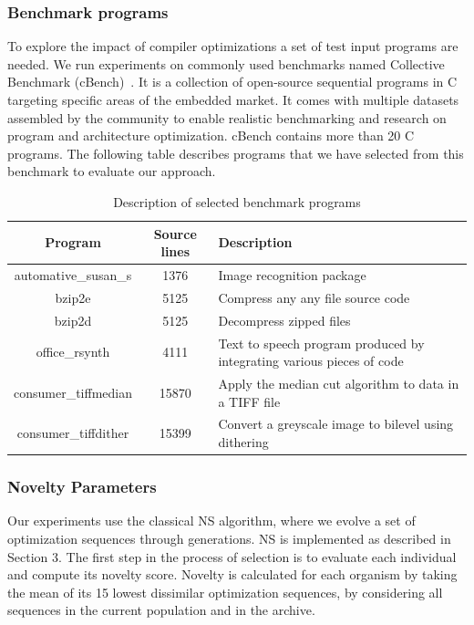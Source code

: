 \subsubsection{Benchmark programs}
To explore the impact of compiler optimizations a set of test input programs are needed. We run experiments on commonly used benchmarks named Collective Benchmark (cBench)~\cite{}. 
It is a collection of open-source sequential programs in C targeting specific areas of the embedded market. It comes with multiple datasets assembled by the community to enable realistic benchmarking and research on program and architecture optimization. cBench contains more than 20 C programs. The following table describes programs that we have selected from this benchmark to evaluate our approach.
\begin{table}[h]
	\begin{center}
		\begin{tabular}{|c|c|p{4cm}|}
			\hline
			\textbf{Program} & \textbf{Source lines} & \textbf{Description}\\
			\hline
			automative\_susan\_s & 1376 & Image recognition package\\
			\hline
			bzip2e & 5125 & Compress any any file
			source code \\
			\hline
			bzip2d & 5125 & Decompress zipped files \\
			\hline
			office\_rsynth & 4111 & Text to speech program produced by integrating various pieces of code\\
			\hline
			consumer\_tiffmedian& 15870 & Apply the median cut algorithm to data in a TIFF file
			\\
			
			\hline
			 consumer\_tiffdither& 15399 & Convert a greyscale image to bilevel using dithering
			 \\
			\hline
			
		\end{tabular}
		
	\end{center}
	\caption {Description of selected benchmark programs}
\end{table}
\subsubsection{Novelty Parameters}
Our experiments use the classical NS algorithm, where we evolve a set of optimization sequences through generations.
NS is implemented as described in Section 3.
The first step in the process of selection is to evaluate each individual and compute its novelty score. Novelty is calculated for each organism by taking the mean of its 15 lowest dissimilar optimization sequences, by considering all sequences in the current population and in the archive. 


